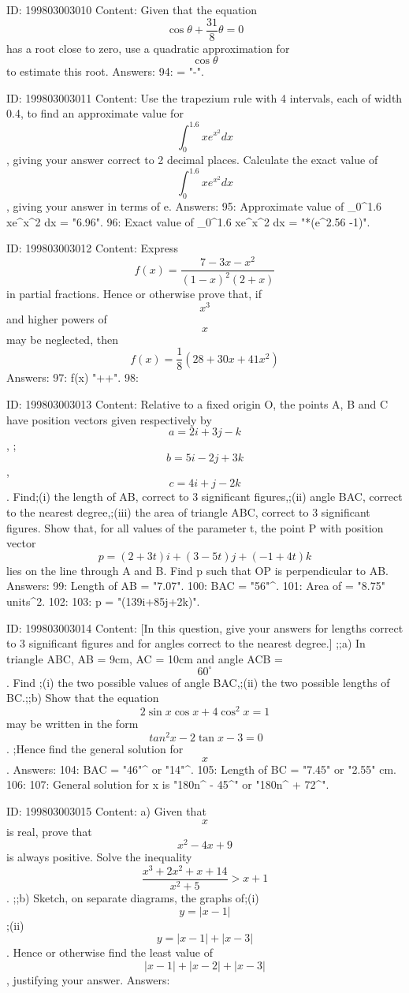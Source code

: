 \documentclass{article}
\begin{document}
ID: 199803003010
Content:
Given that the equation $$\cos  \theta + \frac{31}{8}\theta = 0 $$ has a root close to zero, use a quadratic approximation for $$\cos  \theta$$ to estimate this root. Answers:
94: \theta = "-".

ID: 199803003011
Content:
Use the trapezium rule with 4 intervals, each of width 0.4, to find an approximate value for $$\int^{1.6}_0 x e^{x^2} dx$$, giving your answer correct to 2 decimal places. Calculate the exact value of $$\int^{1.6}_0 x e^{x^2} dx$$, giving your answer in terms of e. Answers:
95: Approximate value of \int_0^1.6 xe^{x^2} dx = "6.96".
96: Exact value of \int_0^1.6 xe^{x^2} dx = "*(e^{2.56} -1)".

ID: 199803003012
Content:
Express $$f(x) = \frac{7 - 3x - x^2}{{( 1 - x )}^2 ( 2 + x )}$$ in partial fractions. Hence or otherwise prove that, if $$x^3$$ and higher powers of $$x$$ may be neglected, then $$f(x) = \frac{1}{8}( 28 + 30x + 41 x^2 )$$Answers:
97: f(x) \equiv "++".
98: 

ID: 199803003013
Content:
Relative to a fixed origin O, the points A, B and C have position vectors given respectively by $$a = 2i + 3j - k$$, ;$$b = 5i - 2j + 3k$$, $$c = 4i + j - 2k$$. Find;(i) the length of AB, correct to 3 significant figures,;(ii) angle BAC, correct to the nearest degree,;(iii) the area of triangle ABC, correct to 3 significant figures. Show that, for all values of the parameter t, the point P with position vector $$p = (2 + 3t)i + (3 - 5t)j + (-1 + 4t)k$$ lies on the line through A and B. Find p such that OP is perpendicular to AB. Answers:
99: Length of AB = "7.07".
100: \angle BAC = "56"^{\circ}.
101: Area of \DeltaABC = "8.75" units^{2}.
102: 
103: p = "(139i+85j+2k)".

ID: 199803003014
Content:
[In this question, give your answers for lengths correct to 3 significant figures and for angles correct to the nearest degree.] ;;a)  In triangle ABC, AB = 9cm, AC = 10cm and angle ACB = $$60^{\circ}$$. Find ;(i) the two possible values of angle BAC,;(ii) the two possible lengths of BC.;;b) Show that the equation $$2\sin  x  \cos  x + 4 {\cos }^2 x = 1$$  may be written in the form $${\ tan }^2 x - 2\tan  x - 3 = 0$$. ;Hence find the general solution for $$x$$. Answers:
104: \angle BAC  = "46"^{\circ} or "14"^{\circ}.
105: Length of BC = "7.45" or "2.55" cm.
106: 
107: General solution for x is "180n^{\circ} - 45^{\circ}" or "180n^{\circ} + 72^{\circ}".

ID: 199803003015
Content:
a)  Given that $$x$$ is real, prove that $$x^2 - 4x + 9$$  is always positive. Solve the inequality $$\frac{x^3 + 2 x^2 + x + 14}{x^2 + 5} > x + 1$$. ;;b) Sketch, on separate diagrams, the graphs of;(i) $$y = |x - 1|$$;(ii)$$y = |x - 1| + |x - 3|$$. Hence or otherwise find the least value of $$|x - 1| + |x - 2| + |x - 3|$$, justifying your answer. Answers:
\end{document}

